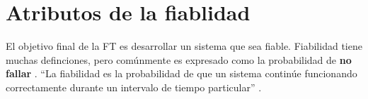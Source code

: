 \section{Atributos de la fiablidad}
El objetivo final de la \ac{FT} es desarrollar un sistema que sea fiable. Fiabilidad tiene muchas 
definciones, pero comúnmente es expresado como la probabilidad de \textbf{no fallar} 
\citep{FTAvionics}. ``La fiabilidad es la probabilidad de que un sistema continúe funcionando 
correctamente durante un intervalo de tiempo particular'' \citep{SoftwareFaultToleranceATutorial}.


